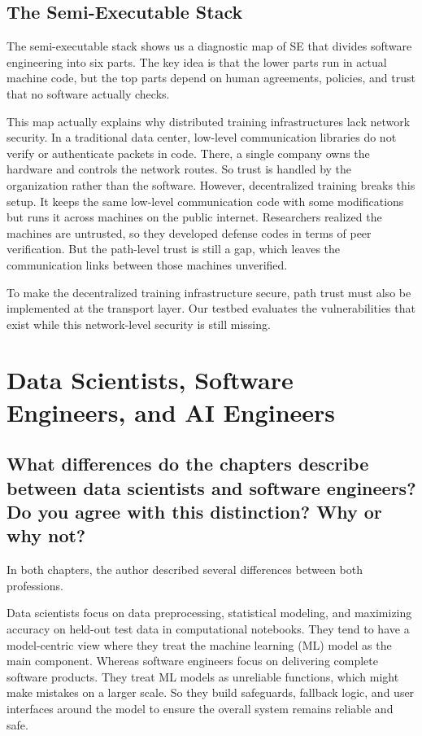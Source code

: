 \documentclass[11pt,a4paper]{article}
\begin{document}
\subsection{The Semi-Executable Stack}

The semi-executable stack shows us a diagnostic map of SE that divides software engineering into six parts. The key idea is that the lower parts run in actual machine code, but the top parts depend on human agreements, policies, and trust that no software actually checks.

This map actually explains why distributed training infrastructures lack network security. In a traditional data center, low-level communication libraries do not verify or authenticate packets in code. There, a single company owns the hardware and controls the network routes. So trust is handled by the organization rather than the software. However, decentralized training breaks this setup. It keeps the same low-level communication code with some modifications but runs it across machines on the public internet. Researchers realized the machines are untrusted, so they developed defense codes in terms of peer verification. But the path-level trust is still a gap, which leaves the communication links between those machines unverified.

To make the decentralized training infrastructure secure, path trust must also be implemented at the transport layer. Our testbed evaluates the vulnerabilities that exist while this network-level security is still missing.

\section{Data Scientists, Software Engineers, and AI Engineers}

\subsection{What differences do the chapters describe between data scientists and software engineers? Do you agree with this distinction? Why or why not?}

In both chapters, the author described several differences between both professions.

Data scientists focus on data preprocessing, statistical modeling, and maximizing accuracy on held-out test data in computational notebooks. They tend to have a model-centric view where they treat the machine learning (ML) model as the main component. Whereas software engineers focus on delivering complete software products. They treat ML models as unreliable functions, which might make mistakes on a larger scale. So they build safeguards, fallback logic, and user interfaces around the model to ensure the overall system remains reliable and safe.
\end{document}
